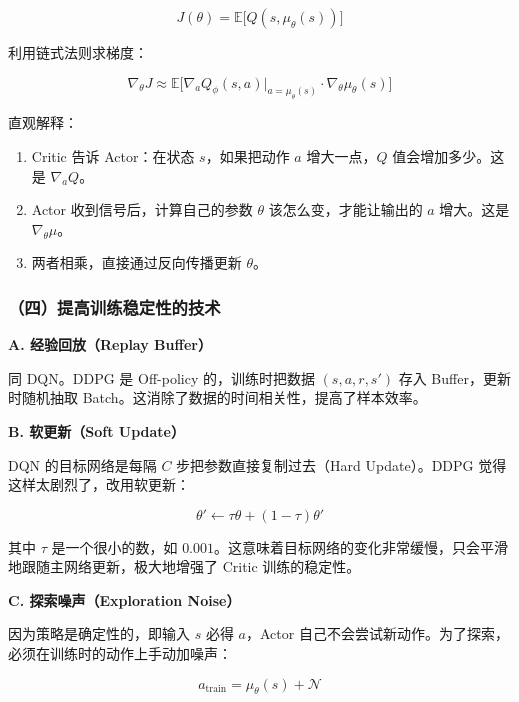 \[
J(\theta)
=
\mathbb{E}\bigl[
Q(s,\mu_\theta(s))
\bigr]
\]

利用链式法则求梯度：

\[
\nabla_\theta J
\approx
\mathbb{E}
\bigl[
\nabla_a Q_\phi(s,a)
\big|_{a=\mu_\theta(s)}
\cdot
\nabla_\theta \mu_\theta(s)
\bigr]
\]

直观解释：

\begin{enumerate}
\def\labelenumi{\arabic{enumi}.}
\tightlist
\item
  Critic 告诉 Actor：在状态 \(s\)，如果把动作 \(a\) 增大一点，\(Q\) 值会增加多少。这是 \(\nabla_a Q\)。
\item
  Actor 收到信号后，计算自己的参数 \(\theta\) 该怎么变，才能让输出的 \(a\) 增大。这是 \(\nabla_\theta\mu\)。
\item
  两者相乘，直接通过反向传播更新 \(\theta\)。
\end{enumerate}

\hypertarget{ux56dbux63d0ux9ad8ux8badux7ec3ux7a33ux5b9aux6027ux7684ux6280ux672f}{%
\subsubsection{（四）提高训练稳定性的技术}\label{ux56dbux63d0ux9ad8ux8badux7ec3ux7a33ux5b9aux6027ux7684ux6280ux672f}}

\textbf{A. 经验回放（Replay Buffer）}

同 DQN。DDPG 是 Off-policy 的，训练时把数据 \((s,a,r,s')\) 存入 Buffer，更新时随机抽取 Batch。这消除了数据的时间相关性，提高了样本效率。

\textbf{B. 软更新（Soft Update）}

DQN 的目标网络是每隔 \(C\) 步把参数直接复制过去（Hard Update）。DDPG 觉得这样太剧烈了，改用软更新：

\[
\theta'
\leftarrow
\tau\theta+(1-\tau)\theta'
\]

其中 \(\tau\) 是一个很小的数，如 \(0.001\)。这意味着目标网络的变化非常缓慢，只会平滑地跟随主网络更新，极大地增强了 Critic 训练的稳定性。

\textbf{C. 探索噪声（Exploration Noise）}

因为策略是确定性的，即输入 \(s\) 必得 \(a\)，Actor 自己不会尝试新动作。为了探索，必须在训练时的动作上手动加噪声：

\[
a_{\mathrm{train}}
=
\mu_\theta(s)+\mathcal{N}
\]

